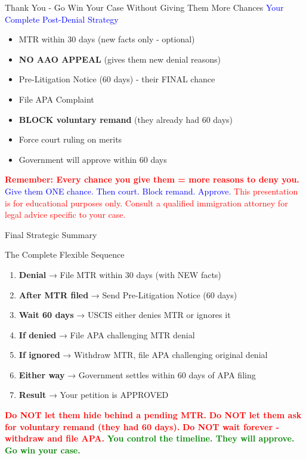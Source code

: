 \documentclass[11pt]{beamer}
\begin{document}
	\begin{frame}{Thank You - Go Win Your Case Without Giving Them More Chances}
		\centering
		\vspace{1cm}
		\textcolor{blue}{\Large Your Complete Post-Denial Strategy}
		\vspace{0.5cm}
		\begin{itemize}
			\item MTR within 30 days (new facts only - optional)
			\item \textbf{NO AAO APPEAL} (gives them new denial reasons)
			\item Pre-Litigation Notice (60 days) - their FINAL chance
			\item File APA Complaint
			\item \textbf{BLOCK voluntary remand} (they already had 60 days)
			\item Force court ruling on merits
			\item Government will approve within 60 days
		\end{itemize}
		\vspace{0.5cm}
		\textcolor{red}{\textbf{Remember: Every chance you give them = more reasons to deny you.}}
		\vspace{0.2cm}
		\textcolor{blue}{\Large Give them ONE chance. Then court. Block remand. Approve.}
		\vspace{0.5cm}
		\textcolor{red}{This presentation is for educational purposes only. Consult a qualified immigration attorney for legal advice specific to your case.}
	\end{frame}
	
	\begin{frame}{Final Strategic Summary}
		\scriptsize
		\begin{block}{The Complete Flexible Sequence}
			\begin{enumerate}
				\item \textbf{Denial} → File MTR within 30 days (with NEW facts)
				\item \textbf{After MTR filed} → Send Pre-Litigation Notice (60 days)
				\item \textbf{Wait 60 days} → USCIS either denies MTR or ignores it
				\item \textbf{If denied} → File APA challenging MTR denial
				\item \textbf{If ignored} → Withdraw MTR, file APA challenging original denial
				\item \textbf{Either way} → Government settles within 60 days of APA filing
				\item \textbf{Result} → Your petition is APPROVED
			\end{enumerate}
			\vspace{0.3cm}
			\textcolor{red}{\textbf{Do NOT let them hide behind a pending MTR.}}
			\textcolor{red}{\textbf{Do NOT let them ask for voluntary remand (they had 60 days).}}
			\textcolor{red}{\textbf{Do NOT wait forever - withdraw and file APA.}}
			\vspace{0.2cm}
			\textcolor{green}{\textbf{You control the timeline. They will approve. Go win your case.}}
		\end{block}
	\end{frame}
	
\end{document}
